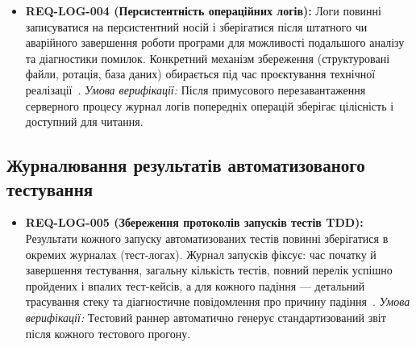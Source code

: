 \begin{itemize}[leftmargin=*,labelindent=0pt]
    \item \textbf{REQ-LOG-004 (Персистентність операційних логів):} Логи повинні записуватися на персистентний носій і зберігатися після штатного чи аварійного завершення роботи програми для можливості подальшого аналізу та діагностики помилок. Конкретний механізм збереження (структуровані файли, ротація, база даних) обирається під час проєктування технічної реалізації~.
    \textit{Умова верифікації:} Після примусового перезавантаження серверного процесу журнал логів попередніх операцій зберігає цілісність і доступний для читання.
\end{itemize}

\subsection{Журналювання результатів автоматизованого тестування}\label{sec:loguvannia-testy}

\begin{itemize}[leftmargin=*,labelindent=0pt]
    \item \textbf{REQ-LOG-005 (Збереження протоколів запусків тестів TDD):} Результати кожного запуску автоматизованих тестів повинні зберігатися в окремих журналах (тест-логах). Журнал запусків фіксує: час початку й завершення тестування, загальну кількість тестів, повний перелік успішно пройдених і впалих тест-кейсів, а для кожного падіння --- детальний трасування стеку та діагностичне повідомлення про причину падіння~.
    \textit{Умова верифікації:} Тестовий раннер автоматично генерує стандартизований звіт після кожного тестового прогону.
\end{itemize}
